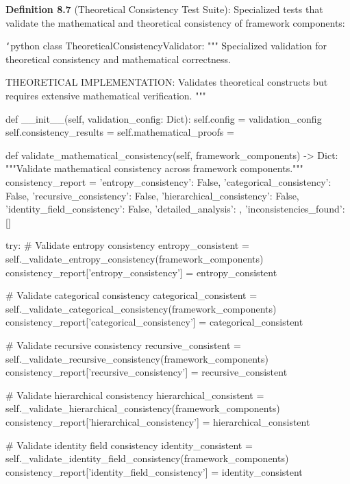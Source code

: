 \textbf{Definition 8.7} (Theoretical Consistency Test Suite): Specialized tests that validate the mathematical and theoretical consistency of framework components:

\texttt{`}python
class TheoreticalConsistencyValidator:
    """
    Specialized validation for theoretical consistency and mathematical correctness.
    
    THEORETICAL IMPLEMENTATION: Validates theoretical constructs
    but requires extensive mathematical verification.
    """
    
    def __init__(self, validation_config: Dict):
        self.config = validation_config
        self.consistency_results = {}
        self.mathematical_proofs = {}
        
    def validate_mathematical_consistency(self, framework_components) -> Dict:
        """Validate mathematical consistency across framework components."""
        consistency_report = {
            'entropy_consistency': False,
            'categorical_consistency': False,
            'recursive_consistency': False,
            'hierarchical_consistency': False,
            'identity_field_consistency': False,
            'detailed_analysis': {},
            'inconsistencies_found': []
        }
        
        try:
            \# Validate entropy consistency
            entropy_consistent = self._validate_entropy_consistency(framework_components)
            consistency_report['entropy_consistency'] = entropy_consistent
            
            \# Validate categorical consistency
            categorical_consistent = self._validate_categorical_consistency(framework_components)
            consistency_report['categorical_consistency'] = categorical_consistent
            
            \# Validate recursive consistency
            recursive_consistent = self._validate_recursive_consistency(framework_components)
            consistency_report['recursive_consistency'] = recursive_consistent
            
            \# Validate hierarchical consistency
            hierarchical_consistent = self._validate_hierarchical_consistency(framework_components)
            consistency_report['hierarchical_consistency'] = hierarchical_consistent
            
            \# Validate identity field consistency
            identity_consistent = self._validate_identity_field_consistency(framework_components)
            consistency_report['identity_field_consistency'] = identity_consistent
            
